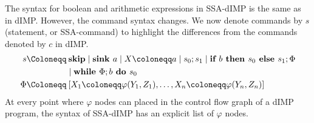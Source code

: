 The syntax for boolean and arithmetic expressions in SSA-dIMP is the same as in dIMP.
However, the command syntax changes.
We now denote commands by $s$ (statement, or SSA-command) to highlight the differences
from the commands denoted by $c$ in dIMP.
\begin{align*}
    s \Coloneqq &\:\skipcmd \mid \defaultsink \mid \defaultstore \mid \defaultssaseq 
    \mid \defaultssaif\\
    &\mid \defaultssawhile \\
    \philist \Coloneqq &\: \defaultphilistn\\
\end{align*}
At every point where $\varphi$ nodes can placed in the control flow graph
of a dIMP program, the syntax of SSA-dIMP has an explicit list of $\varphi$ nodes.

